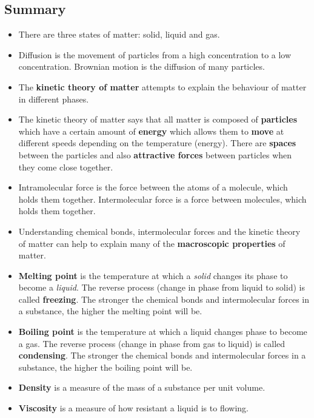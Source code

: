             \subsection{ Summary}
            \nopagebreak
\label{m38730*id311034}\begin{itemize}[noitemsep]
            \label{m38730*id973}\item There are three states of matter: solid, liquid and gas.\label{m38730*id872}\item Diffusion is the movement of particles from a high concentration to a low concentration. Brownian motion is the diffusion of many particles.\label{m38730*uid80}\item The \textbf{kinetic theory of 
matter} attempts to explain the behaviour of matter in different 
phases.
\label{m38730*uid81}\item The kinetic theory of matter says that all matter is 
composed of \textbf{particles} which have a certain 
amount of \textbf{energy} which allows them to 
\textbf{move} at different speeds depending on the 
temperature (energy). There are \textbf{spaces} 
between the particles and also \textbf{attractive 
forces} between particles when they come close together.
\label{m38730*id643}\item Intramolecular force is the force between the atoms of a molecule, which holds 
them together. Intermolecular force is a force between molecules, which holds them together. \label{m38730*uid82}\item Understanding chemical bonds, intermolecular forces and 
the kinetic theory of matter can help to explain many of the \textbf{macroscopic properties} of matter.
\label{m38730*uid83}\item \textbf{Melting point} is the 
temperature at which a \textsl{solid} changes its 
phase to become a \textsl{liquid}. The reverse 
process (change in phase from liquid to solid) is called \textbf{freezing}. The stronger the chemical bonds and 
intermolecular forces in a substance, the higher the melting point will be.
\label{m38730*uid84}\item \textbf{Boiling point} is the 
temperature at which a liquid changes phase to become a gas. The reverse 
process (change in phase from gas to liquid) is called \textbf{condensing}. The stronger the 
chemical bonds and intermolecular forces in a substance, the higher the boiling 
point will be.
\label{m38730*uid85}\item \textbf{Density} is a measure 
of the mass of a substance per unit volume.
\label{m38730*uid86}\item \textbf{Viscosity} is a 
measure of how resistant a liquid is to flowing.
\end{itemize}
\label{m38730*cid9}
